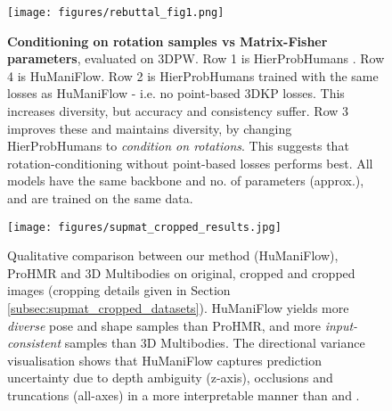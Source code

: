 \begin{figure}[t!]
    \centering
    \texttt{[image: figures/rebuttal\_fig1.png]}
    \caption{\textbf{Conditioning on rotation samples vs Matrix-Fisher parameters}, evaluated on 3DPW. Row 1 is HierProbHumans \cite{sengupta2021hierprobhuman}. Row 4 is HuManiFlow. Row 2 is HierProbHumans trained with the same losses as HuManiFlow - i.e. no point-based 3DKP losses. This increases diversity, but accuracy and consistency suffer. Row 3 improves these and maintains diversity, by changing HierProbHumans to \textit{condition on rotations}. This suggests that rotation-conditioning without point-based losses performs best. All models have the same backbone and no. of parameters (approx.), and are trained on the same data.}
    \vspace{-0.1in}
    \label{fig:supmat_rebuttal_param_vs_rot_cond}
\end{figure}


\begin{figure*}[h!]
    \centering
    \texttt{[image: figures/supmat\_cropped\_results.jpg]}
    \vspace{-0.1cm}
    \caption{Qualitative comparison between our method (HuManiFlow), ProHMR \cite{kolotouros2021prohmr} and 3D Multibodies \cite{biggs2020multibodies} on original,  cropped and  cropped images (cropping details given in Section \ref{subsec:supmat_cropped_datasets}). HuManiFlow yields more \textit{diverse} pose and shape samples than ProHMR, and more \textit{input-consistent }samples than 3D Multibodies. The directional variance visualisation shows that HuManiFlow captures prediction uncertainty due to depth ambiguity (z-axis), occlusions and truncations (all-axes) in a more interpretable manner than \cite{kolotouros2021prohmr} and \cite{biggs2020multibodies}.}
    \label{fig:supmat_cropped_results}
\end{figure*}